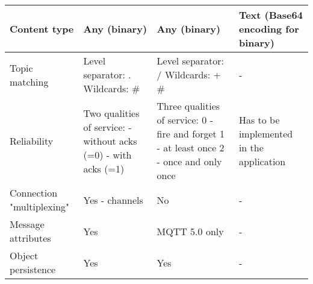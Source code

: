 \begin{table}[htbp]
\begin{center}
\begin{tabular}{|p{3cm}|p{4.5cm}|p{4.5cm}|p{4.5cm}|}
    \hline
    Content type & Any (binary) & Any (binary) & Text (Base64 encoding for binary)\\
    \hline
    Topic matching & Level separator: . Wildcards: \* \# & Level separator: / Wildcards: + \# & - \\
    \hline
    Reliability & Two qualities of service: -without acks (=0) - with acks (=1) & Three qualities of service: 0 - fire and forget 1 - at least once 2 - once and only once & Has to be implemented in the application\\
    \hline
    Connection "multiplexing" & Yes - channels & No & -\\
    \hline
    Message attributes & Yes & MQTT 5.0 only & -\\
    \hline
    Object persistence & Yes & Yes & -\\
    \hline
    \end{tabular}
    \label{edge-cloud protocols}
    \end{center}
    \end{table}